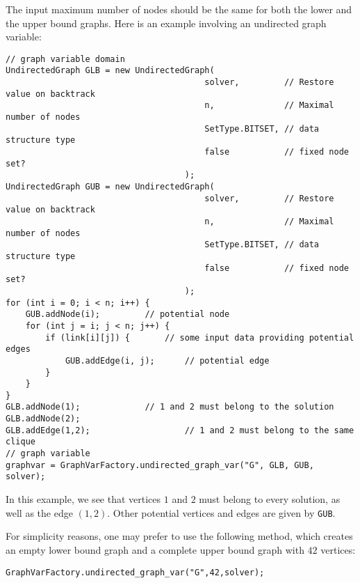 \documentclass{article}
\begin{document}
The input maximum number of nodes should be the same for both the lower and the upper bound graphs. 
%
%
Here is an example involving an undirected graph variable:

\begin{lstlisting}
// graph variable domain
UndirectedGraph GLB = new UndirectedGraph(
										solver,			// Restore value on backtrack
										n,				// Maximal number of nodes
										SetType.BITSET,	// data structure type
										false			// fixed node set?
									);
UndirectedGraph GUB = new UndirectedGraph(
										solver,			// Restore value on backtrack
										n,				// Maximal number of nodes
										SetType.BITSET,	// data structure type
										false			// fixed node set?
									);
for (int i = 0; i < n; i++) {
	GUB.addNode(i);			// potential node
	for (int j = i; j < n; j++) {
		if (link[i][j]) {       // some input data providing potential edges
			GUB.addEdge(i, j);		// potential edge
		}
	}
}
GLB.addNode(1);				// 1 and 2 must belong to the solution
GLB.addNode(2);
GLB.addEdge(1,2);					// 1 and 2 must belong to the same clique
// graph variable
graphvar = GraphVarFactory.undirected_graph_var("G", GLB, GUB, solver);
\end{lstlisting}

In this example, we see that vertices $1$ and $2$ must belong to every solution, as well as the edge $(1,2)$. 
Other potential vertices and edges are given by \texttt{GUB}. 

For simplicity reasons, one may prefer to use the following method, which creates an empty lower bound graph and a complete upper bound graph with $42$ vertices:
\begin{lstlisting}
GraphVarFactory.undirected_graph_var("G",42,solver);
\end{lstlisting}
\end{document}

